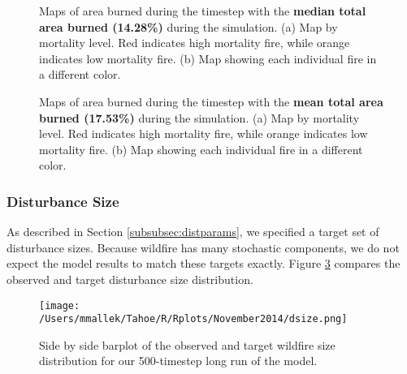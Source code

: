 \begin{figure}[!htbp]
  \centering
  \caption{Maps of area burned during the timestep with the \textbf{median total area burned (14.28\%)} during the simulation. (a) Map by mortality level. Red indicates high mortality fire, while orange indicates low mortality fire. (b) Map showing each individual fire in a different color.}
  \label{fig:darea_median_map}
\end{figure}

\begin{figure}[!htbp]
  \centering
  \caption{Maps of area burned during the timestep with the \textbf{mean total area burned (17.53\%)} during the simulation. (a) Map by mortality level. Red indicates high mortality fire, while orange indicates low mortality fire. (b) Map showing each individual fire in a different color.}
  \label{fig:darea_mean_map}
\end{figure}

\subsubsection{Disturbance Size}
As described in Section \ref{subsubsec:distparams}, we specified a target set of disturbance sizes. Because wildfire has many stochastic components, we do not expect the model results to match these targets exactly. Figure \ref{fig:dsize} compares the observed and target disturbance size distribution.



\begin{figure}[!htbp]
\centering
\texttt{[image: /Users/mmallek/Tahoe/R/Rplots/November2014/dsize.png]}
\caption{Side by side barplot of the observed and target wildfire size distribution for our 500-timestep long run of the model.}
\label{fig:dsize}
\end{figure}



